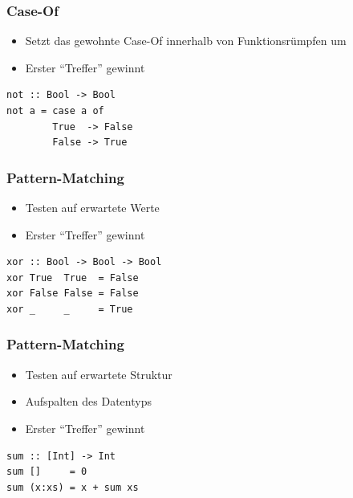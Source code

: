 \documentclass[fleqn,11pt,aspectratio=43]{beamer}
\begin{document}
\begin{frame}[fragile]
\frametitle{Case-Of}
\begin{block}{\vspace*{-2ex}}
\begin{itemize}
	\item Setzt das gewohnte Case-Of innerhalb von Funktionsrümpfen um
	\item Erster "`Treffer"' gewinnt
\end{itemize}
\end{block}
\pause
\begin{lstlisting}
not :: Bool -> Bool
not a = case a of 
        True  -> False
        False -> True 
\end{lstlisting}
\end{frame}

\begin{frame}[fragile]
\frametitle{Pattern-Matching}
\begin{block}{\vspace*{-2ex}}
\begin{itemize}
  \item Testen auf erwartete Werte
  \item Erster "`Treffer"' gewinnt
\end{itemize}
\end{block}
\pause
\begin{lstlisting}
xor :: Bool -> Bool -> Bool
xor True  True  = False
xor False False = False
xor _     _     = True
\end{lstlisting}
\end{frame}

\begin{frame}[fragile]
\frametitle{Pattern-Matching}
\begin{block}{\vspace*{-2ex}}
\begin{itemize}
  \item Testen auf erwartete Struktur
  \item Aufspalten des Datentyps
  \item Erster "`Treffer"' gewinnt
\end{itemize}
\end{block}
\pause
\begin{lstlisting}
sum :: [Int] -> Int
sum []     = 0
sum (x:xs) = x + sum xs
\end{lstlisting}
\end{frame}
\end{document}
